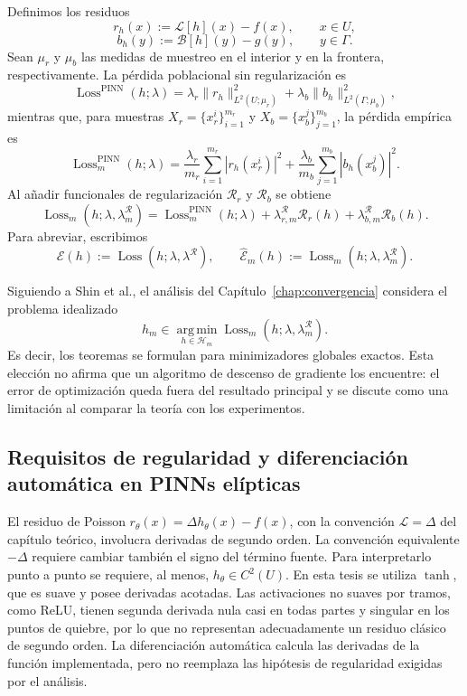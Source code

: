 Definimos los residuos
\[
r_h(x):=\mathcal{L}[h](x)-f(x),\qquad x\in U,
\]
\[
b_h(y):=\mathcal{B}[h](y)-g(y),\qquad y\in\Gamma.
\]
Sean $\mu_r$ y $\mu_b$ las medidas de muestreo en el interior y en la frontera, respectivamente. La pérdida poblacional sin regularización es
\[
\operatorname{Loss}^{\mathrm{PINN}}(h;\lambda)
=
\lambda_r\|r_h\|^2_{L^2(U;\mu_r)}
+
\lambda_b\|b_h\|^2_{L^2(\Gamma;\mu_b)},
\]
mientras que, para muestras
$X_r=\{x_r^i\}_{i=1}^{m_r}$ y
$X_b=\{x_b^j\}_{j=1}^{m_b}$, la pérdida empírica es
\[
\operatorname{Loss}^{\mathrm{PINN}}_m(h;\lambda)
=
\frac{\lambda_r}{m_r}\sum_{i=1}^{m_r}|r_h(x_r^i)|^2
+
\frac{\lambda_b}{m_b}\sum_{j=1}^{m_b}|b_h(x_b^j)|^2.
\]
Al añadir funcionales de regularización $\mathcal{R}_r$ y $\mathcal{R}_b$ se obtiene
\[
\operatorname{Loss}_m(h;\lambda,\lambda_m^{\mathcal R})
=
\operatorname{Loss}^{\mathrm{PINN}}_m(h;\lambda)
+
\lambda_{r,m}^{\mathcal R}\mathcal{R}_r(h)
+
\lambda_{b,m}^{\mathcal R}\mathcal{R}_b(h).
\]
Para abreviar, escribimos
\[
\mathcal{E}(h):=\operatorname{Loss}(h;\lambda,\lambda^{\mathcal R}),
\qquad
\widehat{\mathcal{E}}_m(h):=\operatorname{Loss}_m(h;\lambda,\lambda_m^{\mathcal R}).
\]

Siguiendo a Shin et al., el análisis del Capítulo~\ref{chap:convergencia} considera el problema idealizado
\[
h_m\in\operatorname*{arg\,min}_{h\in\mathcal H_m}
\operatorname{Loss}_m(h;\lambda,\lambda_m^{\mathcal R}).
\]
Es decir, los teoremas se formulan para minimizadores globales exactos. Esta elección no afirma que un algoritmo de descenso de gradiente los encuentre: el error de optimización queda fuera del resultado principal y se discute como una limitación al comparar la teoría con los experimentos.

\subsection{Requisitos de regularidad y diferenciación automática en PINNs elípticas}
\label{sec:reg-ad-pinns}

El residuo de Poisson $r_\theta(x)=\Delta h_\theta(x)-f(x)$, con la convención $\mathcal L=\Delta$ del capítulo teórico, involucra derivadas de segundo orden. La convención equivalente $-\Delta$ requiere cambiar también el signo del término fuente. Para interpretarlo punto a punto se requiere, al menos, $h_\theta\in C^2(U)$. En esta tesis se utiliza $\tanh$, que es suave y posee derivadas acotadas. Las activaciones no suaves por tramos, como ReLU, tienen segunda derivada nula casi en todas partes y singular en los puntos de quiebre, por lo que no representan adecuadamente un residuo clásico de segundo orden. La diferenciación automática calcula las derivadas de la función implementada, pero no reemplaza las hipótesis de regularidad exigidas por el análisis.


